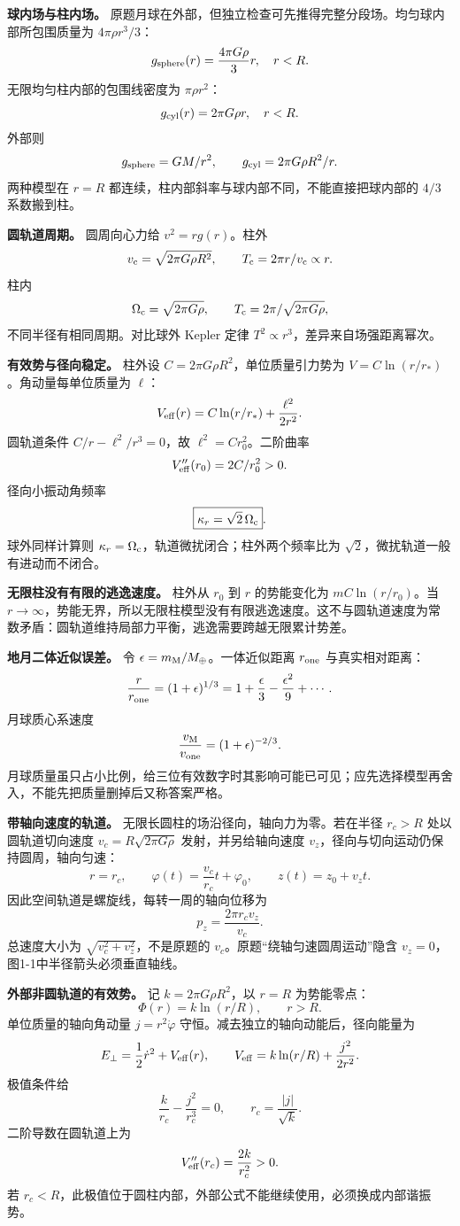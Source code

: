 \documentclass[12pt,a4paper,UTF8]{ctexart}
\begin{document}
\textbf{球内场与柱内场。}
原题月球在外部，但独立检查可先推得完整分段场。均匀球内部所包围质量为
\(4\pi\rho r^3/3\)： \[
g_{\rm sphere}(r)=\frac{4\pi G\rho}{3}r,\quad r<R.
\] 无限均匀柱内部的包围线密度为 \(\pi\rho r^2\)： \[
g_{\rm cyl}(r)=2\pi G\rho r,\quad r<R.
\] 外部则 \[
g_{\rm sphere}=GM/r^2,\qquad
g_{\rm cyl}=2\pi G\rho R^2/r.
\] 两种模型在 \(r=R\) 都连续，柱内部斜率与球内部不同，不能直接把球内部的
\(4/3\) 系数搬到柱。

\textbf{圆轨道周期。} 圆周向心力给 \(v^2=rg(r)\)。柱外 \[
v_{\rm c}=\sqrt{2\pi G\rho R^2},\qquad
T_{\rm c}=2\pi r/v_{\rm c}\propto r.
\] 柱内 \[
\Omega_{\rm c}=\sqrt{2\pi G\rho},\qquad
T_{\rm c}=2\pi/\sqrt{2\pi G\rho},
\] 不同半径有相同周期。对比球外 Kepler 定律
\(T^2\propto r^3\)，差异来自场强距离幂次。

\textbf{有效势与径向稳定。} 柱外设
\(C=2\pi G\rho R^2\)，单位质量引力势为
\(V=C\ln(r/r_*)\)。角动量每单位质量为 \(\ell\)： \[
V_{\rm eff}(r)=C\ln(r/r_*)+\frac{\ell^2}{2r^2}.
\] 圆轨道条件 \(C/r-\ell^2/r^3=0\)，故 \(\ell^2=Cr_0^2\)。二阶曲率 \[
V_{\rm eff}''(r_0)=2C/r_0^2>0.
\] 径向小振动角频率 \[
\boxed{\kappa_r=\sqrt2\,\Omega_{\rm c}}.
\] 球外同样计算则
\(\kappa_r=\Omega_{\rm c}\)，轨道微扰闭合；柱外两个频率比为
\(\sqrt2\)，微扰轨道一般有进动而不闭合。

\textbf{无限柱没有有限的逃逸速度。} 柱外从 \(r_0\) 到 \(r\) 的势能变化为
\(mC\ln(r/r_0)\)。当
\(r\to\infty\)，势能无界，所以无限柱模型没有有限逃逸速度。这不与圆轨道速度为常数矛盾：圆轨道维持局部力平衡，逃逸需要跨越无限累计势差。

\textbf{地月二体近似误差。} 令
\(\epsilon=m_{\rm M}/M_\oplus\)。一体近似距离 \(r_{\rm one}\)
与真实相对距离： \[
\frac{r}{r_{\rm one}}=(1+\epsilon)^{1/3}
=1+\frac{\epsilon}{3}-\frac{\epsilon^2}{9}+\cdots.
\] 月球质心系速度 \[
\frac{v_{\rm M}}{v_{\rm one}}=(1+\epsilon)^{-2/3}.
\]
月球质量虽只占小比例，给三位有效数字时其影响可能已可见；应先选择模型再舍入，不能先把质量删掉后又称答案严格。

\textbf{带轴向速度的轨道。} 无限长圆柱的场沿径向，轴向力为零。若在半径
\(r_c>R\) 处以圆轨道切向速度 \(v_c=R\sqrt{2\pi G\rho}\)
发射，并另给轴向速度 \(v_z\)，径向与切向运动仍保持圆周，轴向匀速： \[
r=r_c,\qquad \varphi(t)=\frac{v_c}{r_c}t+\varphi_0,\qquad
z(t)=z_0+v_zt.
\] 因此空间轨道是螺旋线，每转一周的轴向位移为 \[
\boxed{p_z=\frac{2\pi r_c v_z}{v_c}}.
\] 总速度大小为 \(\sqrt{v_c^2+v_z^2}\)，不是原题的
\(v_c\)。原题``绕轴匀速圆周运动''隐含
\(v_z=0\)，图1-1中半径箭头必须垂直轴线。

\textbf{外部非圆轨道的有效势。} 记 \(k=2\pi G\rho R^2\)，以 \(r=R\)
为势能零点： \[
\Phi(r)=k\ln(r/R),\qquad r>R.
\] 单位质量的轴向角动量 \(j=r^2\dot\varphi\)
守恒。减去独立的轴向动能后，径向能量为 \[
E_\perp=\frac12\dot r^2+V_{\rm eff}(r),\qquad
V_{\rm eff}=k\ln(r/R)+\frac{j^2}{2r^2}.
\] 极值条件给 \[
\frac{k}{r_c}-\frac{j^2}{r_c^3}=0,\qquad r_c=\frac{|j|}{\sqrt k}.
\] 二阶导数在圆轨道上为 \[
V_{\rm eff}''(r_c)=\frac{2k}{r_c^2}>0.
\] 若
\(r_c<R\)，此极值位于圆柱内部，外部公式不能继续使用，必须换成内部谐振势。
\end{document}
